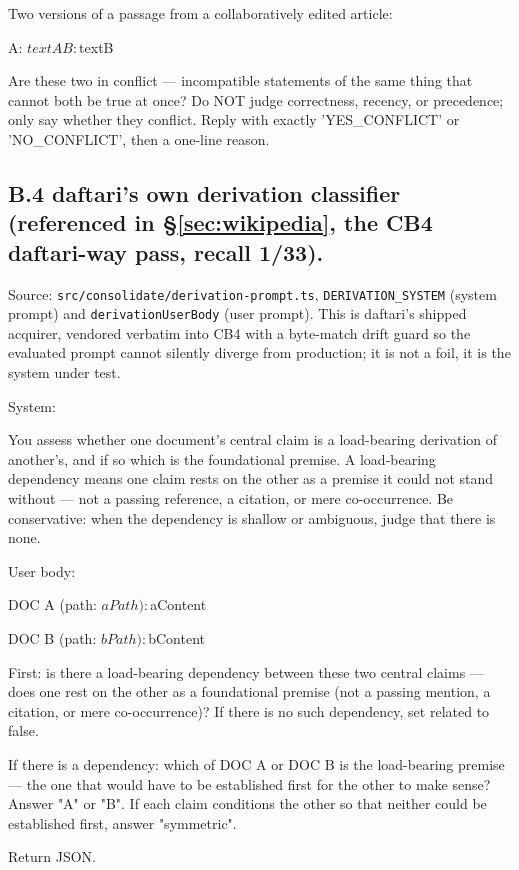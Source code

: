 \documentclass[11pt]{article}
\begin{document}
\begin{promptverb}
Two versions of a passage from a collaboratively edited article:

A: ${textA}

B: ${textB}

Are these two in conflict — incompatible statements of the same thing that
cannot both be true at once? Do NOT judge correctness, recency, or precedence;
only say whether they conflict. Reply with exactly
'YES_CONFLICT' or 'NO_CONFLICT', then a one-line reason.
\end{promptverb}

\subsection*{B.4 daftari's own derivation classifier (referenced in \S\ref{sec:wikipedia}, the CB4 daftari-way pass, recall 1/33).}
Source: \texttt{src/consolidate/derivation-prompt.ts}, \texttt{DERIVATION\_SYSTEM} (system prompt) and
\texttt{derivationUserBody} (user prompt). This is daftari's shipped acquirer, vendored verbatim
into CB4 with a byte-match drift guard so the evaluated prompt cannot silently diverge from
production; it is not a foil, it is the system under test.

System:
\begin{promptverb}
You assess whether one document's central claim is a load-bearing derivation of another's, and if so which is the foundational premise. A load-bearing dependency means one claim rests on the other as a premise it could not stand without — not a passing reference, a citation, or mere co-occurrence. Be conservative: when the dependency is shallow or ambiguous, judge that there is none.
\end{promptverb}

User body:
\begin{promptverb}
DOC A (path: ${aPath}):
${aContent}

DOC B (path: ${bPath}):
${bContent}

First: is there a load-bearing dependency between these two central claims — does one rest on the other as a foundational premise (not a passing mention, a citation, or mere co-occurrence)? If there is no such dependency, set related to false.

If there is a dependency: which of DOC A or DOC B is the load-bearing premise — the one that would have to be established first for the other to make sense? Answer "A" or "B". If each claim conditions the other so that neither could be established first, answer "symmetric".

Return JSON.
\end{promptverb}
\end{document}
